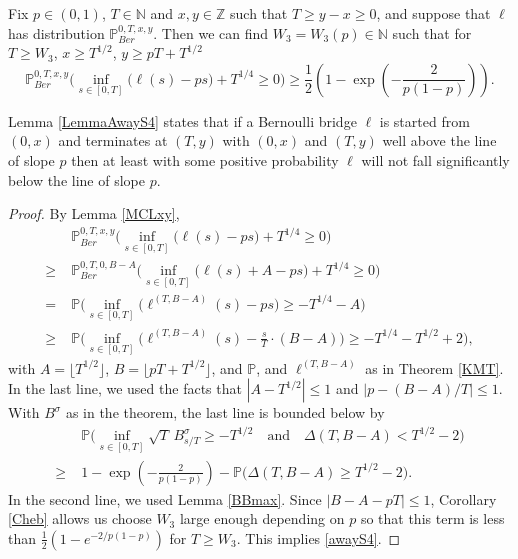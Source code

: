 \begin{lemma}\label{LemmaAwayS4} Fix $p \in (0,1)$, $T \in \mathbb{N}$ and $x, y\in \mathbb{Z}$ such that $T \geq y-x \geq 0$, and suppose that $\ell$ has distribution $\mathbb{P}^{0,T,x,y}_{Ber}$. Then we can find $W_3 = W_3(p) \in \mathbb{N}$ such that for $T \geq W_3$, $ x \geq T^{1/2}$, $ y \geq pT +  T^{1/2}$
\begin{equation}\label{awayS4}
\mathbb{P}^{0,T,x,y}_{Ber}\Big( \inf_{s \in [0,T]} \big( \ell(s) -ps \big)+ T^{1/4} \geq 0 \Big) \geq \frac{1}{2} \left(1 - \exp\left(-\frac{2}{p(1-p)}\right)\right).
\end{equation}
\end{lemma}
\begin{remark} 
Lemma \ref{LemmaAwayS4} states that  if a Bernoulli bridge $\ell$ is started from $(0,x)$ and terminates at $(T,y)$ with $(0,x)$ and $(T,y)$ well above the line of slope $p$ then at least with some positive probability $\ell$ will not fall significantly below the line of slope $p$.
\end{remark}
\begin{proof}
	By Lemma \ref{MCLxy},
	\begin{align*}
	& \mathbb{P}^{0,T,x,y}_{Ber}\Big( \inf_{s \in [0,T]} \big( \ell(s) -ps \big)+ T^{1/4} \geq 0 \Big) \\
	\geq \; & \mathbb{P}^{0,T,0,B-A}_{Ber}\Big( \inf_{s \in [0,T]} \big( \ell(s) + A -ps \big)+ T^{1/4} \geq 0 \Big)\\
	= \; & \mathbb{P}\Big( \inf_{s \in [0,T]} \big( \ell^{(T,B-A)}(s) -ps \big) \geq - T^{1/4} - A \Big)\\
	\geq \; & \mathbb{P}\Big( \inf_{s \in [0,T]} \big( \ell^{(T,B-A)}(s) - \frac{s}{T}\cdot(B-A) \big) \geq - T^{1/4} - T^{1/2} + 2 \Big),
	\end{align*}
	with $A = \lfloor T^{1/2}\rfloor$, $B = \lfloor pT + T^{1/2}\rfloor$, and $\mathbb{P}$, and $\ell^{(T,B-A)}$ as in Theorem \ref{KMT}. In the last line, we used the facts that $|A-T^{1/2}|\leq 1$ and $|p-(B-A)/T|\leq 1$. With $B^\sigma$ as in the theorem, the last line is bounded below by
	\begin{align*}
	&\mathbb{P}\Big( \inf_{s\in[0,T]} \sqrt{T}\,B^\sigma_{s/T} \geq - T^{1/2} \quad \mathrm{and} \quad \Delta(T,B-A) < T^{1/2} - 2 \Big)\\
	\geq \; & 1- \exp\left(-\frac{2}{p(1-p)}\right) - \mathbb{P}\Big( \Delta(T,B-A) \geq T^{1/2} - 2 \Big).
	\end{align*}
	In the second line, we used Lemma \ref{BBmax}. Since $|B-A-pT| \leq 1$, Corollary \ref{Cheb} allows us choose $W_3$ large enough depending on $p$ so that this term is less than $\frac{1}{2}(1-e^{-2/p(1-p)})$ for $T\geq W_3$. This implies \eqref{awayS4}.
\end{proof}


